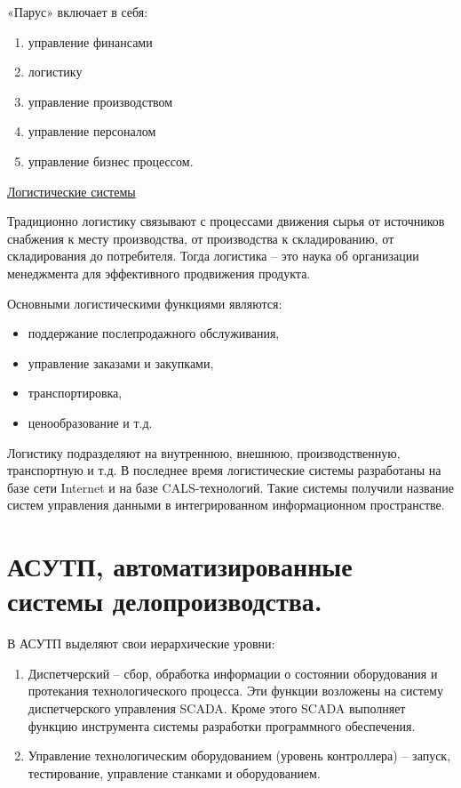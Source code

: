 \documentclass[unicode, 12pt, a4paper, oneside]{article}
\begin{document}
«Парус» включает в себя:

\begin{enumerate}
\item управление финансами
\item логистику
\item управление производством
\item управление персоналом
\item управление бизнес процессом.
\end{enumerate}

\underline{Логистические системы}

Традиционно логистику связывают с процессами движения сырья от источников снабжения к месту производства, от производства к складированию, от складирования до потребителя. Тогда логистика – это наука об организации менеджмента для эффективного продвижения продукта.

Основными логистическими функциями являются:

\begin{itemize}
\item поддержание послепродажного обслуживания,
\item управление заказами и закупками,
\item транспортировка,
\item ценообразование и т.д.
\end{itemize}

Логистику подразделяют на внутреннюю, внешнюю, производственную, транспортную и т.д. В последнее время логистические системы разработаны на базе сети Internet и на базе CALS-технологий. Такие системы получили название систем управления данными в интегрированном информационном пространстве.

\section{АСУТП, автоматизированные системы делопроизводства.}

В АСУТП выделяют свои иерархические уровни:

\begin{enumerate}
\item Диспетчерский – сбор, обработка информации о состоянии оборудования и протекания технологического процесса. Эти функции возложены на систему диспетчерского управления SCADA. Кроме этого SCADA выполняет функцию инструмента системы разработки программного обеспечения.
\item Управление технологическим оборудованием (уровень контроллера) – запуск, тестирование, управление станками и оборудованием.
\end{enumerate}
\end{document}
